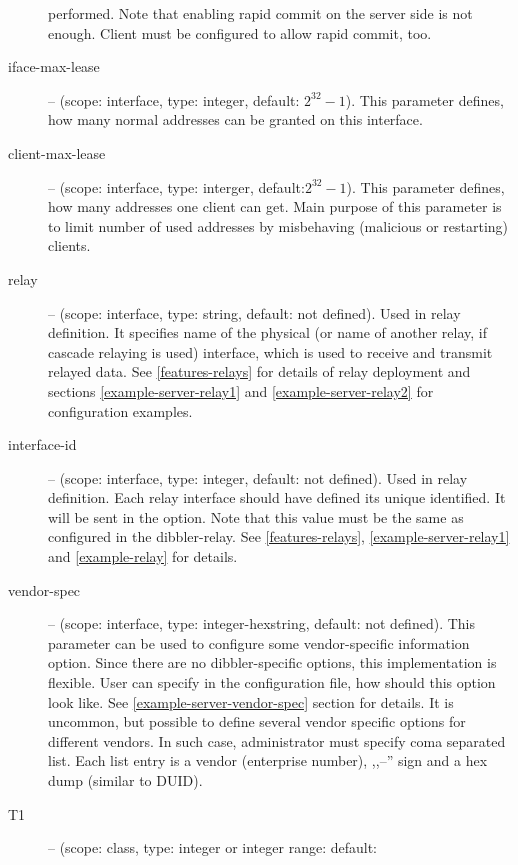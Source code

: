 \begin{description}
            performed. Note that enabling rapid commit on the server
            side is not enough. Client must be configured to allow
	    rapid commit, too.
\item[iface-max-lease] -- (scope: interface, type: integer, default:
            $2^{32}-1$). This parameter defines, how many normal
            addresses can be granted on this interface.
\item[client-max-lease] -- (scope: interface, type: interger,
            default:$2^{32}-1$). This parameter defines, how many
            addresses one client can get. Main purpose of this
            parameter is to limit number of used addresses by
            misbehaving (malicious or restarting) clients.
\item[relay] -- (scope: interface, type: string, default: not
            defined). Used in relay definition.
            It specifies name of the physical (or name of
            another relay, if cascade relaying is used) interface,
            which is used to receive and transmit relayed data. See
            \ref{features-relays} for details of relay deployment and
            sections \ref{example-server-relay1} and
            \ref{example-server-relay2} for configuration examples. 
\item[interface-id] -- (scope: interface, type: integer, default: not
            defined). Used in relay definition. Each relay interface
            should have defined its unique identified. It will be sent
            in the  option. Note that this value
            must be the same as configured in the dibbler-relay. See
            \ref{features-relays}, \ref{example-server-relay1} and
            \ref{example-relay} for details.
 \item[vendor-spec] -- (scope: interface, type: integer-hexstring,
	    default: not defined). This parameter can be used to
	    configure some vendor-specific information option. Since
	    there are no dibbler-specific options, this implementation
	    is flexible. User can specify in the configuration file,
	    how should this option look like. See
	    \ref{example-server-vendor-spec} section for details. It
            is uncommon, but possible to define several vendor
            specific options for different vendors. In such case,
            administrator must specify coma separated list. Each list
            entry is a vendor (enterprise number), ,,--'' sign and a
            hex dump (similar to DUID).
 \item[T1] -- (scope: class, type: integer or integer range: default:

\end{description}
